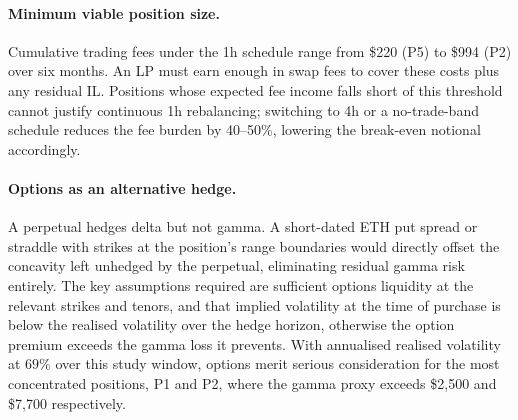 \paragraph{Minimum viable position size.}
Cumulative trading fees under the 1h schedule range from \$220 (P5) to \$994 (P2) over six
months. An LP must earn enough in swap fees to cover these costs plus any residual IL. Positions
whose expected fee income falls short of this threshold cannot justify continuous 1h rebalancing;
switching to 4h or a no-trade-band schedule reduces the fee burden by 40--50\%, lowering the
break-even notional accordingly.

\paragraph{Options as an alternative hedge.}
A perpetual hedges delta but not gamma. A short-dated ETH put spread or straddle with strikes
at the position's range boundaries would directly offset the concavity left unhedged by the
perpetual, eliminating residual gamma risk entirely. The key assumptions required are
sufficient options liquidity at the relevant strikes and tenors, and that implied volatility at
the time of purchase is below the realised volatility over the hedge horizon, otherwise the
option premium exceeds the gamma loss it prevents. With annualised realised volatility at
$69\%$ over this study window, options merit serious consideration for the most concentrated
positions, P1 and P2, where the gamma proxy exceeds \$2{,}500 and \$7{,}700 respectively.
